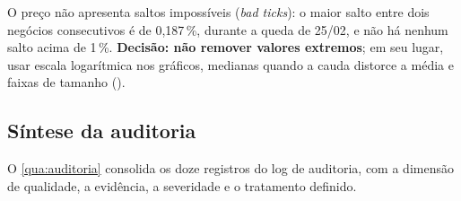 O preço não apresenta saltos impossíveis (\textit{bad ticks}): o maior salto
entre dois negócios consecutivos é de 0,187\,\%, durante a queda de 25/02, e não
há nenhum salto acima de 1\,\%. \textbf{Decisão: não remover valores
extremos}; em seu lugar, usar escala logarítmica nos gráficos, medianas quando a
cauda distorce a média e faixas de tamanho ().

\subsection{Síntese da auditoria}\label{sec:sinteseauditoria}

O \autoref{qua:auditoria} consolida os doze registros do log de auditoria, com a
dimensão de qualidade, a evidência, a severidade e o tratamento definido.


